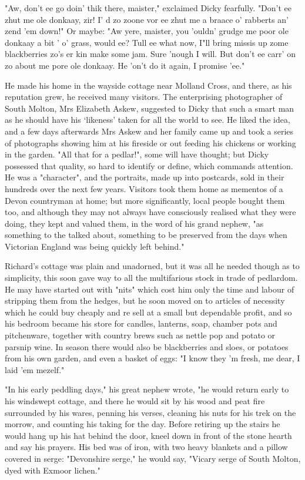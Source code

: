 "Aw, don't ee go doin' thik there, maister," exclaimed Dicky fearfully. "Don't ee zhut me ole donkaay, zir! I' d zo zoone vor ee zhut me a braace o' rabberts an' zend 'em down!"
Or maybe: "Aw yere, maister, you 'ouldn' grudge me poor ole donkaay a bit ' o’ grass, would ee? Tull ee what now, I"ll bring missis up zome blackberries zo's er kin make some jam. Sure 'nough I will. But don't ee carr' on zo about me pore ole donkaay. He 'on't do it again, I promise 'ee."

He made his home in the wayside cottage near Molland Cross, and there, as his reputation grew, he received many visitors. The enterprising photographer of South Molton, Mrs Elizabeth Askew, suggested to Dicky that such a smart man as he should have his ‘likeness’ taken for all the world to see. He liked the idea, and a few days afterwards Mrs Askew and her family came up and took a series of photographs showing him at his fireside or out feeding his chickens or working in the garden. "All that for a pedlar!", some will have thought; but Dicky possessed that quality, so hard to identify or define, which commands attention. He was a "character", and the portraits, made up into postcards, sold in their hundreds over the next few years. Visitors took them home as mementos of a Devon countryman at home; but more significantly, local people bought them too, and although they may not always have consciously realised what they were doing, they kept and valued them, in the word of his grand nephew, "as something to the talked about, something to be preserved from the days when Victorian England was being quickly left behind." 

\Flourish 

Richard's cottage was plain and unadorned, but it was all he needed   though as to simplicity, this soon gave way to all the multifarious stock in trade of pedlardom. He may have started out with "nits" which cost him only the time and labour of stripping them from the hedges, but he soon moved on to articles of necessity which he could buy cheaply and re sell at a small but dependable profit, and so his bedroom became his store for candles, lanterns, soap, chamber pots and pitchenware, together with country brews such as nettle pop and potato or parsnip wine. In season there would also be blackberries and sloes, or potatoes from his own garden, and even a basket of eggs: "I know they 'm fresh, me dear, I laid 'em mezelf."

"In his early peddling days," his great nephew wrote, "he would return early to his windswept cottage, and there he would sit by his wood and peat fire surrounded by his wares, penning his verses, cleaning his nuts for his trek on the morrow, and counting his taking for the day. Before retiring up the stairs he would hang up his hat behind the door, kneel down in front of the stone hearth and say his prayers. His bed was of iron, with two heavy blankets and a pillow covered in serge: "Devonshire serge," he would say, "Vicary serge of South Molton, dyed with Exmoor lichen."

